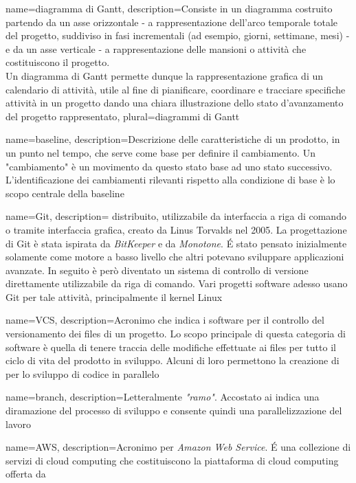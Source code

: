 {
  name=diagramma di Gantt,
  description={Consiste in un diagramma costruito partendo da un asse orizzontale - a rappresentazione dell'arco temporale totale del progetto, suddiviso in fasi incrementali (ad esempio, giorni, settimane, mesi) - e da un asse verticale - a rappresentazione delle mansioni o attività che costituiscono il progetto.\\
  Un diagramma di Gantt permette dunque la rappresentazione grafica di un calendario di attività, utile al fine di pianificare, coordinare e tracciare specifiche attività in un progetto dando una chiara illustrazione dello stato d'avanzamento del progetto rappresentato},
  plural=diagrammi di Gantt
}

{
  name=baseline,
  description={Descrizione delle caratteristiche di un prodotto, in un punto nel tempo, che serve come base per definire il cambiamento. Un "cambiamento" è un movimento da questo stato base ad uno stato successivo. L'identificazione dei cambiamenti rilevanti rispetto alla condizione di base è lo scopo centrale della baseline}
}

{
	name=Git,
	description={ distribuito, utilizzabile da interfaccia a riga di comando o tramite interfaccia grafica, creato da Linus Torvalds nel 2005. La progettazione di Git è stata ispirata da \emph{BitKeeper} e da \emph{Monotone}. \'E stato pensato inizialmente solamente come motore a basso livello che altri potevano sviluppare applicazioni avanzate. In seguito è però diventato un sistema di controllo di versione direttamente utilizzabile da riga di comando. Vari progetti software adesso usano Git per tale attività, principalmente il kernel Linux}
}

{
	name=VCS,
	description={Acronimo che indica i software per il controllo del versionamento dei files di un progetto. Lo scopo principale di questa categoria di software è quella di tenere traccia delle modifiche effettuate ai files per tutto il ciclo di vita del prodotto in sviluppo. Alcuni di loro permettono la creazione di  per lo sviluppo di codice in parallelo}
}

{
	name=branch,
	description={Letteralmente \emph{"ramo"}. Accostato ai  indica una diramazione del processo di sviluppo e consente quindi una parallelizzazione del lavoro}
}

{
	name=AWS,
	description={Acronimo per \emph{Amazon Web Service}. \'E una collezione di servizi di cloud computing che costituiscono la piattaforma di cloud computing offerta da }
}

